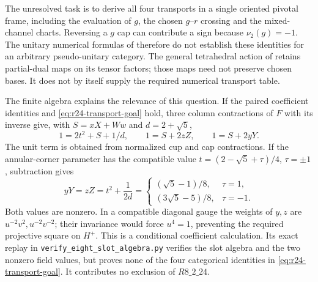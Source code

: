 The unresolved task is to derive all four transports in a single
oriented pivotal frame, including the evaluation of $g$, the chosen
$g$--$r$ crossing and the mixed-channel charts. Reversing a $g$ cap
can contribute a sign because $\nu_2(g)=-1$. The unitary numerical
formulas of \cite{EIP} therefore do not establish these identities
for an arbitrary pseudo-unitary category. The general tetrahedral
action of \cite[Lemma~3.13(ii), Proposition~3.22 and Corollary~4.9]{FGPartialDual}
retains partial-dual maps on its tensor factors; those maps need not
preserve chosen bases. It does not by itself supply the required
numerical transport table.

The finite algebra explains the relevance of this question. If the
paired coefficient identities and \eqref{eq:r24-transport-goal} hold,
three column contractions of $F$ with its inverse give, with
$S=xX+Ww$ and $d=2+\sqrt5$,
\[
 1=2t^2+S+1/d,\qquad
 1=S+2zZ,\qquad 1=S+2yY.
\]
The unit term is obtained from normalized cup and cap contractions.
If the annular-corner parameter has the compatible value
$t=(2-\sqrt5+\tau)/4$, $\tau=\pm1$, subtraction gives
\[
 yY=zZ=t^2+\frac1{2d}
 =\begin{cases}(\sqrt5-1)/8,&\tau=1,\\
 (3\sqrt5-5)/8,&\tau=-1.
 \end{cases}
\]
Both values are nonzero. In a compatible diagonal gauge the weights
of $y,z$ are $u^{-2}v^2,u^{-2}v^{-2}$; their invariance would force
$u^4=1$, preventing the required projective square on $H^+$.
This is a conditional coefficient calculation. Its exact replay in
\texttt{verify\_eight\_slot\_algebra.py} verifies the slot algebra
and the two nonzero field values, but proves none of the four
categorical identities in \eqref{eq:r24-transport-goal}. It contributes
no exclusion of $R8\_2\_24$.
